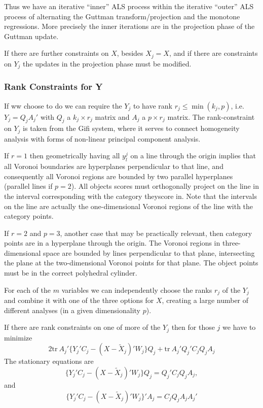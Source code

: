 \documentclass[
  12pt,
]{article}
\begin{document}
Thus we have an iterative ``inner'' ALS process within the iterative
``outer'' ALS process of alternating the Guttman transform/projection and the monotone regressions. More precisely the inner iterations are in the
projection phase of the Guttman update.

If there are further constraints on \(X\), besides \(X_j=X\), and if there
are constraints on \(Y_j\) the updates in the projection phase must
be modified.

\subsubsection{Rank Constraints for Y}\label{rank-constraints-for-y}

If ww choose to do we can require the \(Y_j\) to have rank \(r_j\leq\min(k_j,p)\), i.e.~\(Y_j=Q_jA_j'\)
with \(Q_j\) a \(k_j\times r_j\) matrix and \(A_j\) a \(p\times r_j\) matrix.
The rank-constraint on \(Y_j\) is taken from the Gifi system, where it serves to connect homogeneity analysis with forms of non-linear principal
component analysis.

If \(r=1\) then geometrically having all \(y_l^j\) on a line through the origin implies that all Voronoi boundaries are hyperplanes perpendicular to that line, and consequently all Voronoi regions are bounded by two parallel hyperplanes (parallel lines if \(p=2\)). All objects scores must orthogonally project on the line in the interval corresponding with the category theyscore in. Note that the intervals on the line are actually the one-dimensional Voronoi regions of the line with the category points.

If \(r=2\) and \(p=3\), another case that may be practically relevant, then category points are in a hyperplane through the origin. The Voronoi regions in three-dimensional space are bounded by lines perpendicular to that plane, intersecting the plane at the two-dimensional Voronoi points for that plane. The object points must be in the correct polyhedral cylinder.

For each of the \(m\) variables we can independently choose the ranks \(r_j\) of the \(Y_j\) and combine it with one of the three options for \(X\), creating a large number of different analyses (in a given dimensionality \(p\)).

If there are rank constraints on one of more of the \(Y_j\) then for those \(j\) we have to minimize
\[
2\text{tr}\ A_j'\{Y_j'C_j-(X-\tilde X_j)'W_j\}Q_j+
\text{tr}\ A_j'Q_j'C_jQ_jA_j
\]
The stationary equations are
\[
\{Y_j'C_j-(X-\tilde X_j)'W_j\}Q_j=Q_j'C_jQ_jA_j,
\]
and
\[
\{Y_j'C_j-(X-\tilde X_j)'W_j\}'A_j=C_jQ_jA_jA_j'
\]
\end{document}
